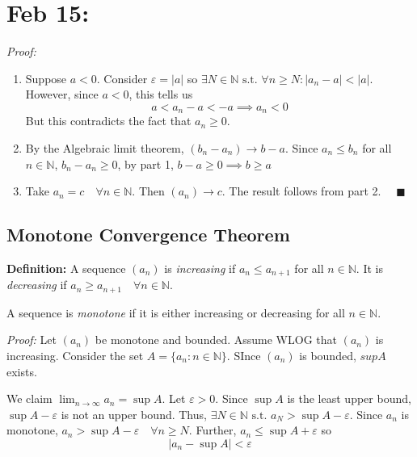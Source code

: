 \documentclass[12pt]{report}
\newcommand{\R}{\mathbb{R}}
\newcommand{\N}{\mathbb{N}}
\newcommand{\qed}{\quad \blacksquare}
\newcommand{\abs}[1]{\left\vert #1 \right\vert}
\newcommand{\st}{\text{ s.t. }}
\newcommand{\ep}{\varepsilon}
\newenvironment*{tbox}[2][gray]{
    \begin{tcolorbox}[
        parbox=false,
        colback=#1!5!white,
        colframe=#1!75!black,
        breakable,
        title={#2}
    ]}
    {\end{tcolorbox}}
\begin{document}
\section{Feb 15:}
    \begin{tbox}{\textbf{Theorem (Order Limit Theorem):} Assume $(a_n) \to a$, $(b_n) \to b$. 
        \begin{enumerate}
            \item If $a_n \geq 0 \quad \forall n \in \N$, then $a \geq 0$
            \item If $a_n \leq b_n \quad \forall n \in \N$, then $a \leq b$
            \item If $\exists c \in \R \st c \leq b_n \quad \forall n \in \N$, then $c \leq b$
        \end{enumerate}}

        \emph{Proof:} 
            \begin{enumerate}
                \item Suppose $a < 0$. Consider $\ep = \abs{a}$ so $\exists N \in \N \st \forall n \geq N: \abs{a_n - a} < \abs{a}$. However, since $a <0$, this tells us 
                \[a < a_n - a < -a \implies a_n < 0\]
                But this contradicts the fact that $a_n \geq 0$.

                \item By the Algebraic limit theorem, $(b_n - a_n) \to b - a$. Since $a_n \leq b_n$ for all $n \in \N$, $b_n - a_n \geq 0$, by part 1, $b - a \geq 0 \implies b \geq a$
                
                \item Take $a_n = c \quad \forall n \in \N$. Then $(a_n) \to c$. The result follows from part 2. $\qed$
            \end{enumerate}
    \end{tbox}

    \subsection*{Monotone Convergence Theorem}
        \textbf{Definition:} A sequence $(a_n)$ is \emph{increasing} if $a_n \leq a_{n+1}$ for all $n \in \N$. It is \emph{decreasing} if $a_n \geq a_{n+1} \quad \forall n \in \N$. 

        A sequence is \emph{monotone} if it is either increasing or decreasing for all $n \in \N$.
        
        \begin{tbox}{\textbf{Theorem (Monotone Convergence Theorem):} If a sequence is monotone and bounded, then it is convergent} 
            \emph{Proof:} Let $(a_n)$ be monotone and bounded. Assume WLOG that $(a_n)$ is increasing. Consider the set $A = \{a_n: n \in \N\}$. SInce $(a_n)$ is bounded, $sup A$ exists. 

            We claim $\lim_{n\to \infty} a_n = \sup A$. Let $\ep > 0$. Since $\sup A$ is the least upper bound, $\sup A - \ep$ is not an upper bound. Thus, $\exists N \in \N \st a_N > \sup A - \ep$. Since $a_n$ is monotone, $a_n > \sup A - \ep \quad \forall n \geq N$. Further, $a_n \leq \sup A + \ep$ so 
            \[\abs{a_n - \sup A} < \ep\]
        \end{tbox}
\end{document}
